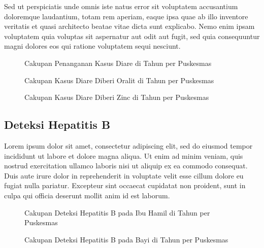 Sed ut perspiciatis unde omnis iste natus error sit voluptatem accusantium doloremque laudantium, totam rem aperiam, eaque ipsa quae ab illo inventore veritatis et quasi architecto beatae vitae dicta sunt explicabo. Nemo enim ipsam voluptatem quia voluptas sit aspernatur aut odit aut fugit, sed quia consequuntur magni dolores eos qui ratione voluptatem sequi nesciunt.

\begin{figure}[H]
	\centering{}
	\caption{Cakupan Penanganan Kasus Diare di \namaKabupaten Tahun \tP per Puskesmas}
	\label{fig:Cakupan-Kasus-Diare-Dilayani}
\end{figure}

\begin{figure}[H]
	\centering{}
	\caption{Cakupan Kasus Diare Diberi Oralit di \namaKabupaten Tahun \tP per Puskesmas}
	\label{fig:Cakupan-Kasus-Diare-Oralit}
\end{figure}

\begin{figure}[H]
	\centering{}
	\caption{Cakupan Kasus Diare Diberi Zinc di \namaKabupaten Tahun \tP per Puskesmas}
	\label{fig:Cakupan-Kasus-Diare-Zinc}
\end{figure}

\subsection{Deteksi Hepatitis B}
Lorem ipsum dolor sit amet, consectetur adipiscing elit, sed do eiusmod tempor incididunt ut labore et dolore magna aliqua. Ut enim ad minim veniam, quis nostrud exercitation ullamco laboris nisi ut aliquip ex ea commodo consequat. Duis aute irure dolor in reprehenderit in voluptate velit esse cillum dolore eu fugiat nulla pariatur. Excepteur sint occaecat cupidatat non proident, sunt in culpa qui officia deserunt mollit anim id est laborum.

\begin{figure}[H]
	\centering{}
	\caption{Cakupan Deteksi Hepatitis B pada Ibu Hamil di \namaKabupaten Tahun \tP per Puskesmas}
	\label{fig:Cakupan-Bumil-HB}
\end{figure}

\begin{figure}[H]
	\centering{}
	\caption{Cakupan Deteksi Hepatitis B pada Bayi di \namaKabupaten Tahun \tP per Puskesmas}
	\label{fig:Cakupan-Bayi-HBIG}
\end{figure}

